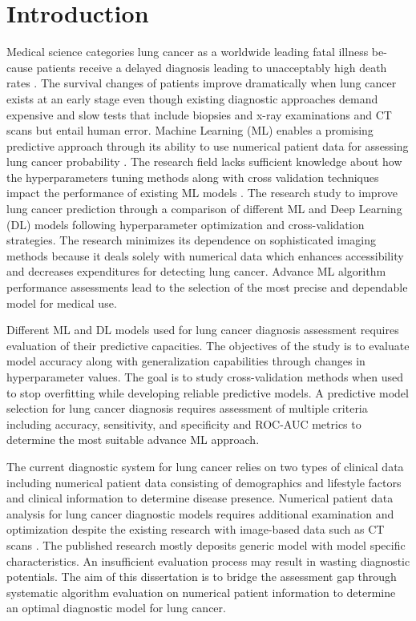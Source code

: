 \documentclass[runningheads]{llncs}
\begin{document}
\section{Introduction}
Medical science categories lung cancer as a worldwide leading fatal illness be-cause patients receive a delayed diagnosis leading to  unacceptably high death rates \cite{heuvelmans2021}. The survival changes of patients improve dramatically when lung cancer exists at an early stage even though existing diagnostic approaches demand expensive and slow tests that include biopsies and x-ray examinations and CT scans but entail human error. Machine Learning (ML) enables a promising predictive approach through its ability to use numerical patient data for assessing lung cancer probability \cite{heuvelmans2021,kadir2018}. The research field lacks sufficient knowledge about how the hyperparameters tuning methods along with cross validation techniques impact the performance of existing ML models \cite{kadir2018}. The research study to improve lung cancer prediction through a comparison of different ML and Deep Learning (DL) models following hyperparameter optimization and cross-validation strategies. The research minimizes its dependence on sophisticated imaging methods because it deals solely with numerical data which enhances accessibility and decreases expenditures for detecting lung cancer. Advance ML algorithm performance assessments lead to the selection of the most precise and dependable model for medical use. 

Different ML and DL models used for lung cancer diagnosis assessment requires evaluation of their predictive capacities. The objectives of the study is to evaluate model accuracy along with generalization capabilities through changes in hyperparameter values. The goal is to study cross-validation methods when used to stop overfitting while developing reliable predictive models. A predictive model selection for lung cancer diagnosis requires assessment of multiple criteria including accuracy, sensitivity, and specificity and ROC-AUC metrics to determine the most suitable advance ML approach.

The current diagnostic system for lung cancer relies on two types of clinical data including numerical patient data consisting of demographics and lifestyle factors and clinical information to determine disease presence. Numerical patient data analysis for lung cancer diagnostic models requires additional examination and optimization despite the existing research with image-based data such as CT scans \cite{kadir2018}. The published research mostly deposits generic model with model specific characteristics. An insufficient evaluation process may result in wasting diagnostic potentials. The aim of this dissertation is to bridge the assessment gap through systematic algorithm evaluation on numerical patient information to determine an optimal diagnostic model for lung cancer.
\end{document}
